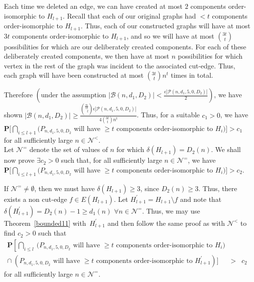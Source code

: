 \documentclass{article}
\newtheorem{Proof of Theorem}{Proof of Theorem}
\begin{document}
Each time we deleted an edge,
we can have created at most $2$ components order-isomorphic to $H_{l+1}$.
Recall that each of our original graphs had $<t$ components order-isomorphic to $H_{l+1}$.
Thus, each of our constructed graphs will have at most $3t$ components order-isomorphic to $H_{l+1}$,
and so we will have at most $\left( ^{3t}_{\phantom{i}t} \right)$
possibilities for which are our deliberately created components.
For each of these deliberately created components,
we then have at most $n$ possibilities for which vertex in the rest of the graph was 
incident to the associated cut-edge.
Thus, each graph will have been constructed at most 
$\left( ^{3t}_{\phantom{i}t} \right) n^{t}$ times in total.

Therefore $\left( \textrm{under the assumption }
|\mathcal{B}(n,d_{1},D_{2})| < \frac{\epsilon |\mathcal{P}(n,d_{1},5,0,D_{2})|}{2} \right)$,
we have shown
$|\mathcal{B}(n,d_{1},D_{2})| \geq 
\frac{\left( ^{\frac{\beta n}{12}}_{\phantom{w}t} \right) \epsilon |\mathcal{P}(n,d_{1},5,0,D_{2})|}
{4 \left( ^{3t}_{\phantom{i}t} \right) n^{t}}$.
Thus, for a suitable $c_{1}>0$,
we have
$\mathbf{P}\big[ \bigcap_{i \leq l+1} (P_{n,d_{1},5,0,D_{2}}$ 
will have $\geq t$ components order-isomorphic to $H_{i}) \big] > c_{1}$
for all sufficiently large $n \in \mathcal{N}^{<}$. \\

Let $\mathcal{N}^{=}$ denote the set of values of $n$ for which $\delta(H_{l+1})=D_{2}(n)$.
We shall now prove $\exists c_{2}>0$ such that, 
for all sufficiently large $n \in \mathcal{N}^{=}$,
we have
$\mathbf{P}\big[ \bigcap_{i \leq l+1} (P_{n,d_{1},5,0,D_{2}}$ 
will have $\geq t$ components order-isomorphic to $H_{i}) \big] > c_{2}$.

If $\mathcal{N}^{=} \neq \emptyset$,
then we must have $\delta(H_{l+1}) \geq 3$,
since $D_{2}(n) \geq 3$.
Thus, there exists a non cut-edge $f \in E(H_{l+1})$.
Let $H_{l+1}^{\prime} = H_{l+1} \setminus f$
and note that $\delta(H_{l+1}^{\prime}) = D_{2}(n)-1 \geq d_{1}(n)$ $\forall n \in \mathcal{N}^{=}$.
Thus, we may use Theorem~\ref{bounded11} with~$H_{l+1}^{\prime}$
and then follow the same proof as with $\mathcal{N}^{<}$ to find $c_{2}>0$
such that 
\begin{eqnarray*}
\mathbf{P}\left[ \bigcap_{i \leq l}~(P_{n,d_{1},5,0,D_{2}} \right.
\textrm{ will have $\geq t$ components order-isomorphic to $H_{i}$} ) & \\
\cap~(P_{n,d_{1},5,0,D_{2}} 
\textrm{ will have $\geq t$ components order-isomorphic to $H_{l+1}^{\prime}$} )\biggr] & > & c_{2}
\end{eqnarray*}
for all sufficiently large $n \in \mathcal{N}^{=}$. 
\end{document}
